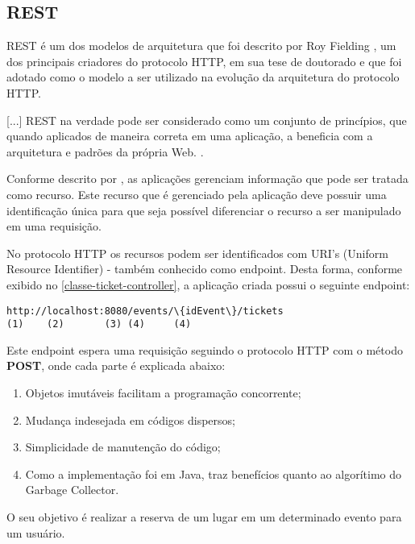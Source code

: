 \subsection{REST}\label{rest}

\begin{citacao}

REST é um dos modelos de arquitetura que foi descrito por
Roy Fielding \cite[5]{rest-roy-thomas-fielding},
um dos principais criadores do protocolo HTTP, em sua tese de doutorado
e que foi adotado como o modelo a ser utilizado na evolução da arquitetura
do protocolo HTTP.

[...] REST na verdade pode ser considerado como um conjunto de princípios,
que quando aplicados de maneira correta em uma aplicação, a beneficia com a
arquitetura e padrões da própria Web. \cite{rest-principios-e-boas-praticas}.

\end{citacao}

Conforme descrito por \cite{rest-principios-e-boas-praticas}, as aplicações
gerenciam informação que pode ser tratada como recurso. Este recurso que é
gerenciado pela aplicação deve possuir uma identificação única para que seja
possível diferenciar o recurso a ser manipulado em uma requisição.

No protocolo HTTP os recursos podem ser identificados com
URI's (Uniform Resource Identifier) - também conhecido como endpoint.
Desta forma, conforme exibido no \autoref{classe-ticket-controller},
a aplicação criada possui o seguinte endpoint:

\begin{lstlisting}[basicstyle=\ttfamily]
http://localhost:8080/events/\{idEvent\}/tickets
(1)    (2)       (3) (4)     (4)
\end{lstlisting}

Este endpoint espera uma requisição seguindo o protocolo HTTP
com o método \textbf{POST}, onde cada parte é explicada abaixo:

\begin{enumerate}

  \item Objetos imutáveis facilitam a programação concorrente;

  \item Mudança indesejada em códigos dispersos;

  \item Simplicidade de manutenção do código;

  \item Como a implementação foi em Java, traz benefícios quanto ao algorítimo do
        Garbage Collector.

\end{enumerate}

O seu objetivo é realizar a reserva de um lugar em um determinado evento para um
usuário.
